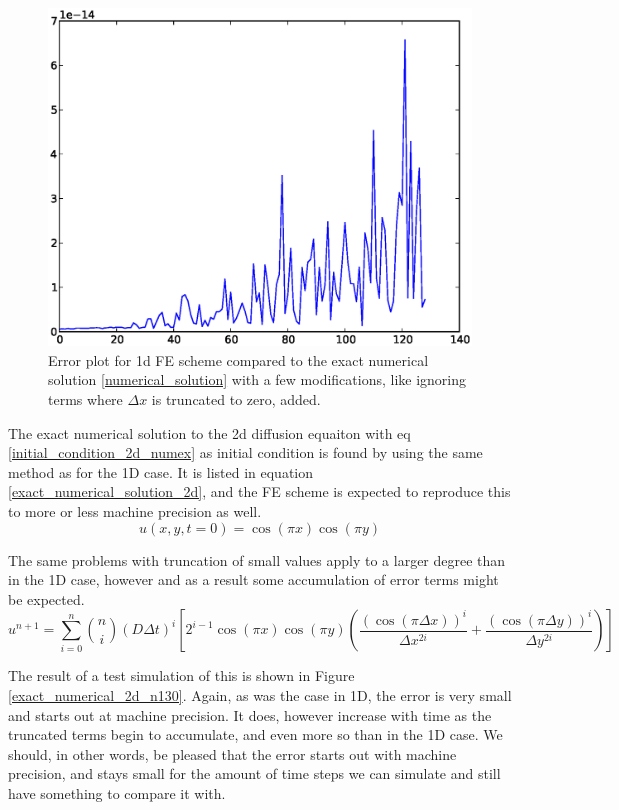 \begin{figure}[H]
 \centering
 \includegraphics[scale=0.7]{Figures/exact_numerical_1d_n130.eps}
 \caption[Verification for exact numerical solution]{Error plot for 1d FE scheme compared to the exact numerical solution \ref{numerical_solution} with a few modifications, like ignoring terms where $\Delta x$ is truncated to zero, added.}
 \label{errorplot_numerical_exact_FE_1D}
\end{figure}
The exact numerical solution to the 2d diffusion equaiton with eq \ref{initial_condition_2d_numex} as initial condition is found by using the same method as for the 1D case.
It is listed in equation \eqref{exact_numerical_solution_2d}, and the FE scheme is expected to reproduce this to more or less machine precision as well. 
\begin{equation}\label{initial_condition_2d_numex}
 u(x,y,t=0) = \cos(\pi x)\cos(\pi y)
\end{equation}

The same problems with truncation of small values apply to a larger degree than in the 1D case, however and as a result some accumulation of error terms might be expected. 
\begin{equation}\label{exact_numerical_solution_2d}
 u^{n+1} = \sum\limits^n_{i=0}{n\choose i}\left(D\Delta t\right)^i\left[2^{i-1}\cos(\pi x)\cos(\pi y)\left(\frac{(\cos(\pi\Delta x))^i}{\Delta x^{2i}} +\frac{(\cos(\pi\Delta y))^i}{\Delta y^{2i}}\right)\right]
\end{equation}

The result of a test simulation of this is shown in Figure \ref{exact_numerical_2d_n130}. 
Again, as was the case in 1D, the error is very small and starts out at machine precision. It does, however increase with time as the truncated terms begin to accumulate, and even more so than in the 1D case. 
We should, in other words, be pleased that the error starts out with machine precision, and stays small for the amount of time steps we can simulate and still have something to compare it with.


